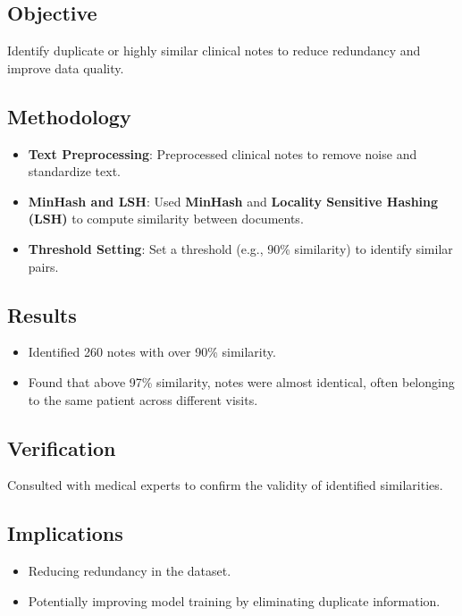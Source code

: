 \documentclass[12pt,a4paper]{report}
\begin{document}
\subsection{Objective}
Identify duplicate or highly similar clinical notes to reduce redundancy and improve data quality.

\subsection{Methodology}
\begin{itemize}
    \item \textbf{Text Preprocessing}: Preprocessed clinical notes to remove noise and standardize text.
    \item \textbf{MinHash and LSH}: Used \textbf{MinHash} and \textbf{Locality Sensitive Hashing (LSH)} to compute similarity between documents.
    \item \textbf{Threshold Setting}: Set a threshold (e.g., 90\% similarity) to identify similar pairs.
\end{itemize}

\subsection{Results}
\begin{itemize}
    \item Identified 260 notes with over 90\% similarity.
    \item Found that above 97\% similarity, notes were almost identical, often belonging to the same patient across different visits.
\end{itemize}

\subsection{Verification}
Consulted with medical experts to confirm the validity of identified similarities.

\subsection{Implications}
\begin{itemize}
    \item Reducing redundancy in the dataset.
    \item Potentially improving model training by eliminating duplicate information.
\end{itemize}
\end{document}
